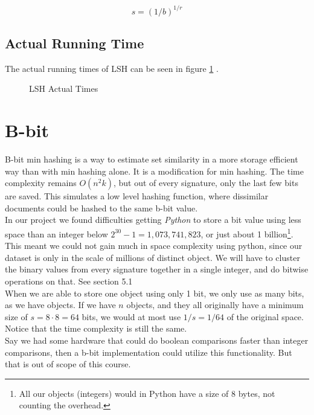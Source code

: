 \documentclass[a4paper,11pt]{article}
\begin{document}
\begin{equation}
    s = (1/b)^{1/r}
    \label{eq:s-estimate}
\end{equation}


\subsection{Actual Running Time}
The actual running times of LSH can be seen in figure  \ref{fig:lsh_at} .

\begin{figure}[!htpb]
    \begin{center}
        
        \caption{LSH Actual Times}
        \label{fig:lsh_at}
    \end{center}
\end{figure}

\section{B-bit}
B-bit min hashing is a way to estimate set similarity in a more storage efficient way than with min hashing alone. It is a modification for min hashing. The time complexity remains $O(n^2k)$, but out of every signature, only the last few bits are saved. This simulates a low level hashing function, where dissimilar documents could be hashed to the same b-bit value. \\

In our project we found difficulties getting \emph{Python} to store a bit value using less space than an integer below $2^{30}-1 = 1,073,741,823$, or just about 1 billion\footnote{All our objects (integers) would in Python have a size of 8 bytes, not counting the overhead.}. This meant we could not gain much in space complexity using python, since our dataset is only in the scale of millions of distinct object. We will have to cluster the binary values from every signature together in a single integer, and do bitwise operations on that. See \cite{article:bbit} section 5.1  \\

When we are able to store one object using only 1 bit, we only use as many bits, as we have objects. If we have $n$ objects, and they all originally have a minimum size of $s = 8 \cdot 8 = 64$ bits, we would at most use $1/s = 1/64$ of the original space. Notice that the time complexity is still the same. \\

Say we had some hardware that could do boolean comparisons faster than integer comparisons, then a b-bit implementation could utilize this functionality. But that is out of scope of this course. \\
\end{document}
